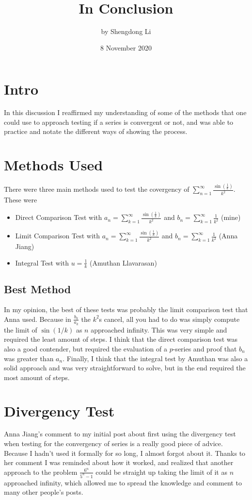 \documentclass[12pt]{article}
\begin{document}
\title{In Conclusion}
\author{by Shengdong Li}
\date{8 November 2020}
\maketitle

\section{Intro}

In this discussion I reaffirmed my understanding of some of the methods that one could use to approach testing if a series is convergent or not, and was able to practice and notate the different ways of showing the process. 

\section{Methods Used}
There were three main methods used to test the covergency of $\sum_{n=1}^{\infty} \frac{\sin\left(\frac{1}{k}\right)}{k^{2}}$. These were
\begin{itemize}
  \item Direct Comparison Test with $a_n=\sum_{k=1}^{\infty}\frac{\sin\left(\frac{1}{k}\right)}{k^{2}}$ and $b_n=\sum_{k=1}^{\infty}\frac{1}{k^{2}}$ (mine)
  \item Limit Comparison Test with $a_n=\sum_{k=1}^{\infty}\frac{\sin\left(\frac{1}{k}\right)}{k^{2}}$ and $b_n=\sum_{k=1}^{\infty}\frac{1}{k^{2}}$ (Anna Jiang)
  \item Integral Test with $u=\frac{1}{k}$ (Amuthan Llavarasan)
\end{itemize}

\subsection{Best Method}

In my opinion, the best of these tests was probably the limit comparison test that Anna used. Because in $\frac{b_k}{a_k}$ the $k^2$s cancel, all you had to do was simply compute the limit of $\sin(1/k)$ as $n$ approached infinity. This was very simple and required the least amount of steps. I think that the direct comparison test was also a good contender, but required the evaluation of a $p$-series and proof that $b_n$ was greater than $a_n$. Finally, I think that the integral test by Amuthan was also a solid approach and was very straightforward to solve, but in the end required the most amount of steps.

\section{Divergency Test}
Anna Jiang's comment to my initial post about first using the divergency test when testing for the convergency of series is a really good piece of advice. Because I hadn't used it formally for so long, I almost forgot about it. Thanks to her comment I was reminded about how it worked, and realized that another approach to the problem $\frac{6^{n}}{5^{n}-1}$ could be straight up taking the limit of it as $n$ approached infinity, which allowed me to spread the knowledge and comment to many other people's posts.
\end{document}

